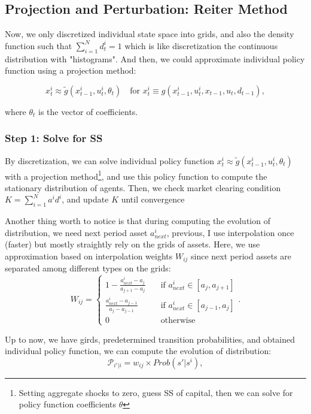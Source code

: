\subsection{Projection and Perturbation: Reiter Method}

Now, we only {\color{red} discretized individual state space into grids}, and also the density function such that $\sum_{i=1}^{N} d^i_t = 1$ which is like discretization the continuous distribution with "histograms". And then, we could approximate individual policy function using a projection method:

\[ 
x^i_t \approx \tilde{g}(x^i_{t-1},u^i_t, \theta_t) \quad \text{for } x^i_t \equiv g(x^i_{t-1}, u^i_t, x_{t-1},u_t,d_{t-1}), 
\]

where $\theta_t$ is the vector of coefficients. 

\subsubsection*{Step 1: Solve for SS}

By discretization, we can solve individual policy function $x^i_t \approx \tilde{g}(x^i_{t-1},u^i_t, \theta_t)$ with a projection method\footnote{Setting aggregate shocks to zero, guess SS of capital, then we can solve for policy function coefficients $\theta$}, and use this policy function to compute the stationary distribution of agents. Then, we check market clearing condition $K=\sum_{i=1}^{N} a^i d^i$, and update $K$ until convergence

Another thing worth to notice is that during computing the evolution of distribution, we need next period asset $a^i_{next}$, previous, I use interpolation once (faster) but mostly straightly rely on the grids of assets. Here, we use approximation based on interpolation weights $W_{ij}$ since next period assets are separated among different types on the grids: 
\[
 W_{ij}=
 \begin{cases}
 1- \frac{a^i_{next} - a_j}{a_{j+1}-a_j} \quad &\text{if } a^i_{next} \in [a_j, a_{j+1}]\\ 
 \frac{a^i_{next} - a_{j-1}}{a_{j}-a_{j-1}} \quad &\text{if } a^i_{next} \in [a_{j-1}, a_{j}] \\
 0  \quad &\text{otherwise } 
 \end{cases}. 
\]

Up to now, we have girds, predetermined transition probabilities, and obtained individual policy function, we can compute the {\color{red} evolution of distribution}: 
\[ \mathcal{P}_{i'|i} = w_{ij} \times Prob(s'| s^i), \]

